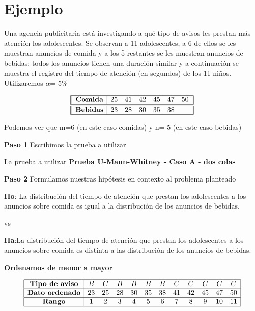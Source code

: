 \documentclass[a4paper,oneside,openany]{book}
\begin{document}
\section{Ejemplo}\label{ejemplo-5}

Una agencia publicitaria está investigando a qué tipo de avisos les
prestan más atención los adolescentes. Se observan a 11 adolescentes, a
6 de ellos se les muestran anuncios de comida y a los 5 restantes se les
muestran anuncios de bebidas; todos los anuncios tienen una duración
similar y a continuación se muestra el registro del tiempo de atención
(en segundos) de los 11 niños. Utilizaremos \(\alpha\)= 5\%

\[
\begin{equation*}
\begin{array}{||c| c c c c c c||} 
\hline
\textbf{Comida} & 25 & 41 & 42 & 45 & 47 & 50 \\
\hline\hline
\textbf{Bebidas}& 23 & 28 & 30 & 35 & 38 &  \\ 
\hline
\end{array}
\end{equation*}
\]

Podemos ver que m=6 (en este caso comidas) y n= 5 (en este caso bebidas)

\textbf{Paso 1} Escribimos la prueba a utilizar

La prueba a utilizar \textbf{Prueba U-Mann-Whitney - Caso A - dos colas}

\textbf{Paso 2} Formulamos nuestras hipótesis en contexto al problema
planteado

\textbf{Ho}: La distribución del tiempo de atención que prestan los
adolescentes a los anuncios sobre comida es igual a la distribución de
los anuncios de bebidas.

vs

\textbf{Ha}:La distribución del tiempo de atención que prestan los
adolescentes a los anuncios sobre comida es distinta a las distribución
de los anuncios de bebidas.

\textbf{Ordenamos de menor a mayor}

\[
\begin{equation*}
\begin{array}{ |c| c c c c c c c c c c c| }
\hline
 \textbf{Tipo de aviso} & B & C & B & B & B & B & C & C & C & C & C \\ 
 \hline
 \textbf{Dato ordenado} & 23 & 25 & 28 & 30 & 35 & 38 & 41 & 42 & 45 & 47 & 50 \\ 
 \hline
 \textbf{Rango}         & 1 & 2 & 3 & 4 & 5 & 6 & 7 & 8 & 9 & 10 & 11 \\ 
 \hline
\end{array}
\end{equation*}
\]
\end{document}
